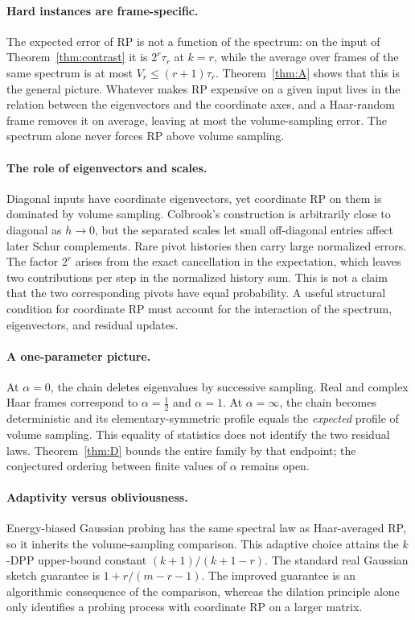 \documentclass[11pt,a4paper]{article}
\theoremstyle{definition}
\begin{document}
\paragraph{Hard instances are frame-specific.} The expected error of RP is not a function of the spectrum: on the input of Theorem~\ref{thm:contrast} it is $2^r\tau_r$ at $k=r$, while the average over frames of the same spectrum is at most $V_r\le(r+1)\tau_r$. Theorem~\ref{thm:A} shows that this is the general picture. Whatever makes RP expensive on a given input lives in the relation between the eigenvectors and the coordinate axes, and a Haar-random frame removes it on average, leaving at most the volume-sampling error. The spectrum alone never forces RP above volume sampling.

\paragraph{The role of eigenvectors and scales.} Diagonal inputs have coordinate eigenvectors, yet coordinate RP on them is dominated by volume sampling. Colbrook's construction is arbitrarily close to diagonal as $h\to0$, but the separated scales let small off-diagonal entries affect later Schur complements. Rare pivot histories then carry large normalized errors. The factor $2^r$ arises from the exact cancellation in the expectation, which leaves two contributions per step in the normalized history sum. This is not a claim that the two corresponding pivots have equal probability. A useful structural condition for coordinate RP must account for the interaction of the spectrum, eigenvectors, and residual updates.

\paragraph{A one-parameter picture.} At $\alpha=0$, the chain deletes eigenvalues by successive sampling. Real and complex Haar frames correspond to $\alpha=\frac12$ and $\alpha=1$. At $\alpha=\infty$, the chain becomes deterministic and its elementary-symmetric profile equals the \emph{expected} profile of volume sampling. This equality of statistics does not identify the two residual laws. Theorem~\ref{thm:D} bounds the entire family by that endpoint; the conjectured ordering between finite values of $\alpha$ remains open.

\paragraph{Adaptivity versus obliviousness.} Energy-biased Gaussian probing has the same spectral law as Haar-averaged RP, so it inherits the volume-sampling comparison. This adaptive choice attains the $k$-DPP upper-bound constant $(k+1)/(k+1-r)$. The standard real Gaussian sketch guarantee is $1+r/(m-r-1)$. The improved guarantee is an algorithmic consequence of the comparison, whereas the dilation principle alone only identifies a probing process with coordinate RP on a larger matrix.
\end{document}

